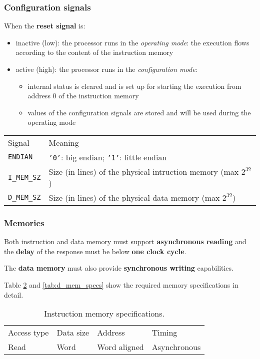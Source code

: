\subsubsection{Configuration signals}
When the \textbf{reset signal} is:
\begin{itemize}
	\item inactive (low): the processor runs in the \textit{operating mode}:
		the execution flows according to the content of the instruction
		memory
	\item active (high): the processor runs in the \textit{configuration mode}:
		\begin{itemize}
			\item internal status is cleared and is set up for
				starting the execution from address 0 of the
				instruction memory
			\item values of the configuration signals are stored
				and will be used during the operating mode
		\end{itemize}
\end{itemize}

\begin{table}[H]
	\centering
	\begin{tabular}{ll}
		\hline
		\rowcolor{gray!50}
		Signal & Meaning \\
		\texttt{ENDIAN} & \texttt{'0'}: big endian; \texttt{'1'}: little endian \\
		\rowcolor{gray!25}
		\texttt{I\_MEM\_SZ} & Size (in lines) of the physical intruction
			memory (max $2^{32}$) \\
		\texttt{D\_MEM\_SZ} & Size (in lines) of the physical data memory 
			(max $2^{32}$) \\
		\hline
	\end{tabular}
	\label{tab:config_signals}
\end{table}

\subsubsection{Memories}
Both instruction and data memory must support \textbf{asynchronous reading} and
the \textbf{delay} of the response must be below \textbf{one clock cycle}.

The \textbf{data memory} must also provide \textbf{synchronous writing} capabilities.

\bigskip
Table \ref{tab:i_mem_specs} and \ref{tab:d_mem_specs} show the required memory
specifications in detail.

\begin{table}[H]
	\centering
	\begin{tabular}{llll}
		\hline
		\rowcolor{gray!50}
		Access type & Data size & Address & Timing \\
		Read & Word & Word aligned & Asynchronous \\
		\hline
	\end{tabular}
	\caption{Instruction memory specifications.}
	\label{tab:i_mem_specs}
\end{table}

